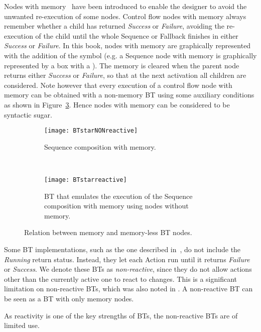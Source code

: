 Nodes with memory~\cite{millington2009artificial} have been introduced to enable the designer to avoid the unwanted re-execution of some nodes. Control flow nodes with memory always remember whether a child has returned  \emph{Success} or \emph{Failure}, avoiding the re-execution of the child until the whole Sequence or Fallback finishes in either \emph{Success} or \emph{Failure}. In this book, nodes with memory are graphically represented with the addition of the symbol  \say{$*$} (e.g. a Sequence node with memory is graphically represented by a box with a \say{$\rightarrow^*$}).
The memory is cleared when the parent node returns either  \emph{Success} or \emph{Failure}, so that at the next activation all children are considered. Note however that every execution of a control flow node with memory can be obtained with a non-memory BT using some auxiliary conditions as shown in Figure~\ref{bts.fig.mem}. Hence nodes with memory can be considered to be syntactic sugar.

\begin{figure}[h]
          
          
        \begin{subfigure}[b]{0.3\columnwidth}
                \centering
                \texttt{[image: BTstarNONreactive]}
                \caption{Sequence composition with memory.}
                \label{bts.fig.starnonreac}
        \end{subfigure}          
        ~ %
        \begin{subfigure}[b]{0.6\columnwidth}
                \centering
                \texttt{[image: BTstarreactive]}
                \caption{BT that emulates the execution of the Sequence composition with memory using nodes without memory.}
                \label{bts.fig.starreac}              
        \end{subfigure}
        \caption{Relation between memory and memory-less BT nodes.}
                        \label{bts.fig.mem}              
\end{figure}

\begin{remark}
 Some BT implementations, such as the one described in~\cite{millington2009artificial},  do not include the \emph{Running} return status. Instead, they let each Action run until it returns \emph{Failure} or \emph{Success}. We denote these BTs as  \emph{non-reactive}, since they do not allow  actions other than the currently active one to react to changes. This is a significant limitation on non-reactive BTs, which was also noted in \cite{millington2009artificial}. A non-reactive BT can be seen as a BT with only memory nodes.
 
As reactivity is one of the key strengths of BTs, the non-reactive BTs are of limited use. 
\end{remark}


